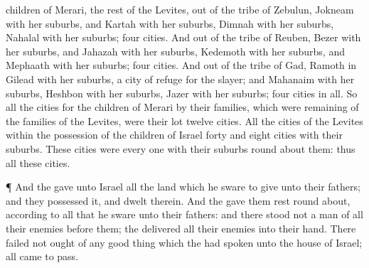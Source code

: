 {children of
Merari, the
rest of the
Levites, out of the
tribe of
Zebulun,
Jokneam with her
suburbs, and
Kartah with her
suburbs,
Dimnah with her
suburbs,
Nahalal with her
suburbs;
four
cities.
And out of the tribe of
Reuben,
Bezer with her suburbs, and
Jahazah with her suburbs,
Kedemoth with her suburbs, and
Mephaath with her suburbs;
four
cities.
And out of the
tribe of
Gad,
Ramoth in
Gilead with her
suburbs,
{} a
city of
refuge for the
slayer; and
Mahanaim with her
suburbs,
Heshbon with her
suburbs,
Jazer with her
suburbs;
four
cities in all.
So all the
cities for the
children of
Merari by their
families, which were
remaining of the
families of the
Levites, were
{} their
lot
twelve
cities.
All the
cities of the
Levites
within the
possession of the
children of
Israel
{}
forty and
eight
cities with their
suburbs.
These
cities were every
one with their
suburbs round
about them: thus
{} all these
cities.
\par }{\PP {}¶ And the
{}
gave unto
Israel all the
land which he
sware to
give unto their
fathers; and they
possessed it, and
dwelt therein.
And the
{} gave them
rest round
about, according to all that he
sware unto their
fathers: and there
stood not a
man of all their
enemies
before them; the
{}
delivered all their
enemies into their
hand.
There
failed not
ought of any
good
thing which the
{} had
spoken unto the
house of
Israel; all came to
pass.

}
